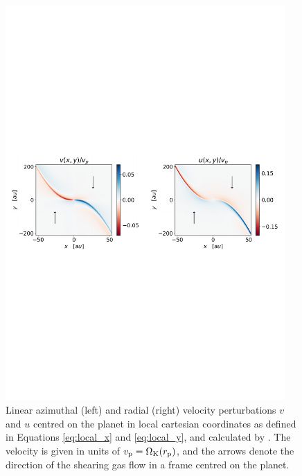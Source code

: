 \begin{figure}
    \centering
    \includegraphics[width = 0.95\textwidth]{figures/linear_box_bollati.pdf}
    \caption{Linear azimuthal (left) and radial (right) velocity perturbations $v$ and $u$ centred on the planet in local cartesian coordinates as defined in Equations \eqref{eq:local_x} and \eqref{eq:local_y}, and calculated by \citet{bollati2021}. The velocity is given in units of $v_{\rm p} = \Omega_{\rm K}(r_{\rm p})$, and the arrows denote the direction of the shearing gas flow in a frame centred on the planet.}
    \label{fig:lin_box_bollati}
\end{figure}

